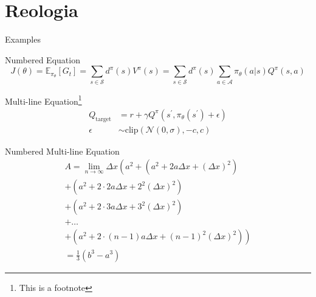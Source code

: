 \section{Reologia}

\begin{frame}{Examples}
    \begin{exampleblock}{Numbered Equation}
        \begin{equation} %
            J(\theta) = \mathbb{E}_{\pi_\theta}[G_t] = \sum_{s\in\mathcal{S}} d^\pi (s)V^\pi(s)=\sum_{s\in\mathcal{S}} d^\pi(s)\sum_{a\in\mathcal{A}}\pi_\theta(a|s)Q^\pi(s,a)
        \end{equation}
    \end{exampleblock}
    \begin{exampleblock}{Multi-line Equation\footnote{This is a footnote}}
        \begin{align}
            Q_\mathrm{target}&=r+\gamma Q^\pi(s^\prime, \pi_\theta(s^\prime)+\epsilon)\\
            \epsilon&\sim\mathrm{clip}(\mathcal{N}(0, \sigma), -c, c)\nonumber
        \end{align}
    \end{exampleblock}
\end{frame}

\begin{frame}
    \begin{exampleblock}{Numbered Multi-line Equation}
        \begin{multline}
            A=\lim_{n\rightarrow\infty}\Delta x\left(a^{2}+\left(a^{2}+2a\Delta x+\left(\Delta x\right)^{2}\right)\right.\label{eq:reset}\\
            +\left(a^{2}+2\cdot2a\Delta x+2^{2}\left(\Delta x\right)^{2}\right)\\
            +\left(a^{2}+2\cdot3a\Delta x+3^{2}\left(\Delta x\right)^{2}\right)\\
            +\ldots\\
            \left.+\left(a^{2}+2\cdot(n-1)a\Delta x+(n-1)^{2}\left(\Delta x\right)^{2}\right)\right)\\
            =\frac{1}{3}\left(b^{3}-a^{3}\right)
        \end{multline}
    \end{exampleblock}
\end{frame}

